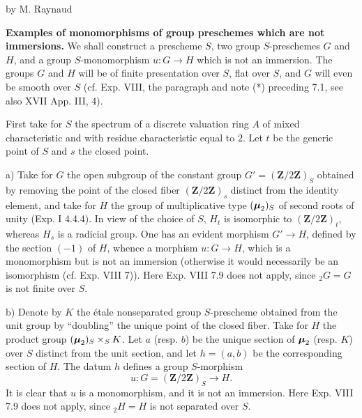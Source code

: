 \label{XVI}
\begin{center}by M. Raynaud{\renewcommand{\thefootnote}{*}\footnotemark}\end{center}
{\renewcommand{\thefootnote}{*}}
{\renewcommand{\thefootnote}{0}}
\setcounter{footnote}{0}

\label{XVI.1.1}\textbf{Examples of monomorphisms of group preschemes which are not immersions.}
We shall construct a prescheme $S$, two group $S$-preschemes $G$ and $H$, and a group $S$-monomorphism $u:G\to H$ which is not an immersion. The groups $G$ and $H$ will be of finite presentation over $S$, flat over $S$, and $G$ will even be smooth over $S$ (cf. Exp. VIII, the paragraph and note (*) preceding 7.1, see also XVII App. III, 4).

First take for $S$ the spectrum of a discrete valuation ring $A$ of mixed characteristic and with residue characteristic equal to $2$. Let $t$ be the generic point of $S$ and $s$ the closed point.

\noindent a) Take for $G$ the open subgroup of the constant group $G'=(\mathbf Z/2\mathbf Z)_S$ obtained by removing the point of the closed fiber $(\mathbf Z/2\mathbf Z)_s$ distinct from the identity element, and take for $H$ the group of multiplicative type $(\boldsymbol{\mu}_2)_S$ of second roots of unity (Exp. I 4.4.4). In view of the choice of $S$, $H_t$ is isomorphic to $(\mathbf Z/2\mathbf Z)_t$, whereas $H_s$ is a radicial group. One has an evident morphism $G'\to H$, defined by the section $(-1)$ of $H$, whence a morphism $u:G\to H$, which is a monomorphism but is not an immersion (otherwise it would necessarily be an isomorphism (cf. Exp. VIII 7)). Here Exp. VIII 7.9 does not apply, since ${}_2G=G$ is not finite over $S$.

\noindent b) Denote by $K$ the étale nonseparated group $S$-prescheme obtained from the unit group by ``doubling'' the unique point of the closed fiber. Take for $H$ the product group $(\boldsymbol{\mu}_2)_S\times_S K$. Let $a$ (resp. $b$) be the unique section of $\boldsymbol{\mu}_2$ (resp. $K$) over $S$ distinct from the unit section, and let $h=(a,b)$ be the corresponding section of $H$. The datum $h$ defines a group $S$-morphism
\[
u:G=(\mathbf Z/2\mathbf Z)_S\longrightarrow H.
\]
It is clear that $u$ is a monomorphism, and it is not an immersion. Here Exp. VIII 7.9 does not apply, since ${}_2H=H$ is not separated over $S$.

